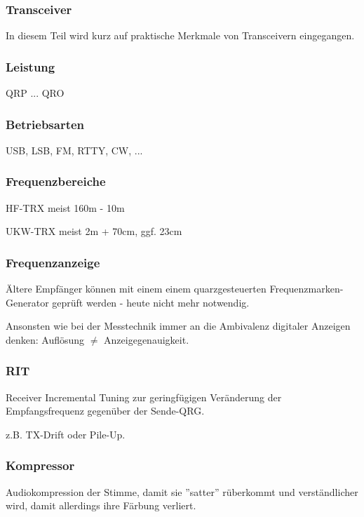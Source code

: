 \begin{frame}
    \frametitle{Transceiver}

    In diesem Teil wird kurz auf praktische Merkmale von Transceivern
    eingegangen.

\end{frame}

\begin{frame}
    \frametitle{Leistung}

    \Large QRP ... QRO


\end{frame}

\begin{frame}
    \frametitle{Betriebsarten}

    USB, LSB, FM, RTTY, CW, ...

\end{frame}

\begin{frame}
    \frametitle{Frequenzbereiche}

    HF-TRX meist 160m - 10m

    \bigskip

    UKW-TRX meist 2m + 70cm, ggf. 23cm

\end{frame}

\begin{frame}
    \frametitle{Frequenzanzeige}

    Ältere Empfänger können mit einem einem quarzgesteuerten
    Frequenzmarken-Generator geprüft werden - heute nicht mehr notwendig.

    \bigskip

    Ansonsten wie bei der Messtechnik immer an die Ambivalenz digitaler Anzeigen
    denken: Auflösung $\neq$ Anzeigegenauigkeit.

\end{frame}

\begin{frame}
    \frametitle{RIT}

    Receiver Incremental Tuning zur geringfügigen Veränderung der
    Empfangsfrequenz gegenüber der Sende-QRG.

    \bigskip

    z.B. TX-Drift oder Pile-Up.

\end{frame}

\begin{frame}
    \frametitle{Kompressor}

    Audiokompression der Stimme, damit sie ''satter'' rüberkommt und
    verständlicher wird, damit allerdings ihre Färbung verliert.

\end{frame}

